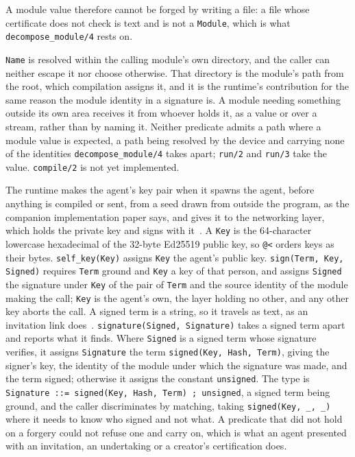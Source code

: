 A module value therefore cannot be forged by writing a file: a file whose certificate does not check is text and is not a \verb|Module|, which is what \verb|decompose_module/4| rests on.

\verb|Name| is resolved within the calling module's own directory, and the caller can neither escape it nor choose otherwise. That directory is the module's path from the root, which compilation assigns it, and it is the runtime's contribution for the same reason the module identity in a signature is. A module needing something outside its own area receives it from whoever holds it, as a value or over a stream, rather than by naming it. Neither predicate admits a path where a module value is expected, a path being resolved by the device and carrying none of the identities \verb|decompose_module/4| takes apart; \verb|run/2| and \verb|run/3| take the value. \verb|compile/2| is not yet implemented.

The runtime makes the agent's key pair when it spawns the agent, before anything is compiled or sent, from a seed drawn from outside the program, as the companion implementation paper says, and gives it to the networking layer, which holds the private key and signs with it~\cite{bachar2026networking}.  A \verb|Key| is the 64-character lowercase hexadecimal of the 32-byte Ed25519 public key, so \verb|@<| orders keys as their bytes. \verb|self_key(Key)| assigns \verb|Key| the agent's public key. \verb|sign(Term, Key, Signed)| requires \verb|Term| ground and \verb|Key| a key of that person, and assigns \verb|Signed| the signature under \verb|Key| of the pair of \verb|Term| and the source identity of the module making the call; \verb|Key| is the agent's own, the layer holding no other, and any other key aborts the call.  A signed term is a string, so it travels as text, as an invitation link does~\cite{bachar2026networking}. \verb|signature(Signed, Signature)| takes a signed term apart and reports what it finds. Where \verb|Signed| is a signed term whose signature verifies, it assigns \verb|Signature| the term \verb|signed(Key, Hash, Term)|, giving the signer's key, the identity of the module under which the signature was made, and the term signed; otherwise it assigns the constant \verb|unsigned|. The type is \verb|Signature ::= signed(Key, Hash, Term) ; unsigned|, a signed term being ground, and the caller discriminates by matching, taking \verb|signed(Key, _, _)| where it needs to know who signed and not what. A predicate that did not hold on a forgery could not refuse one and carry on, which is what an agent presented with an invitation, an undertaking or a creator's certification does.

